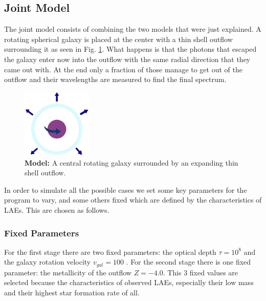 \documentclass{latex/emulateapj}
\begin{document}
\subsection{Joint Model}

The joint model consists of combining the two models that were just explained. A rotating spherical galaxy is placed at the center with a thin shell outflow surrounding it as seen in Fig. \ref{fig:model}. What happens is that the photons that escaped the galaxy enter now into the outflow with the same radial direction that they came out with. At the end only a fraction of those manage to get out of the outflow and their wavelengths are measured to find the final spectrum.\\

\begin{figure}[h!]
\begin{center}
  \includegraphics[width=0.3\textwidth]{./figures/model.png}
\end{center}
\caption{\textbf{Model:} A central rotating galaxy surrounded by an expanding thin shell outflow.\\
\label{fig:model}}
\end{figure}

In order to simulate all the possible cases we set some key parameters for the program to vary, and some others fixed which are defined by the characteristics of LAEs. This are chosen as follows.\\

\subsubsection{Fixed Parameters}

For the first stage there are two fixed parameters: the optical depth $\tau = 10^8$ and the galaxy rotation velocity $v_{gal}=100$ \kms. For the second stage there is one fixed parameter: the metallicity of the outflow $Z=-4.0$. This 3 fixed values are selected because the characteristics of observed LAEs, especially their low mass and their highest star formation rate of all.\\
\end{document}
